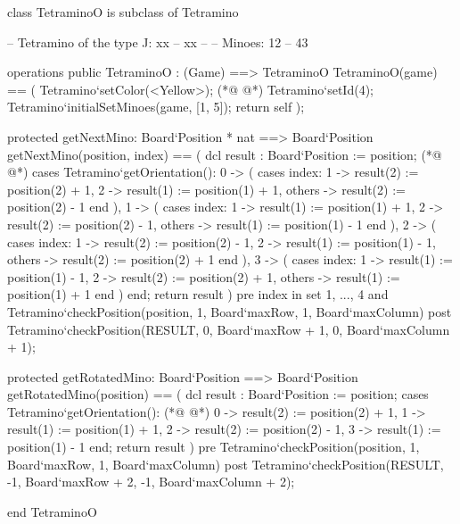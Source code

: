 \begin{vdmpp}[breaklines=true]
class TetraminoO is subclass of Tetramino
  
 -- Tetramino of the type J: xx
 --         xx
 --  
 -- Minoes:       12
 --         43
 

 operations
  public TetraminoO : (Game) ==> TetraminoO
  TetraminoO(game) == (
   Tetramino`setColor(<Yellow>);
(*@
\label{TetraminoO:14}
@*)
   Tetramino`setId(4);
   Tetramino`initialSetMinoes(game, [1, 5]);
   return self
  );

  protected getNextMino: Board`Position * nat ==> Board`Position
  getNextMino(position, index) == (
   dcl result : Board`Position := position;
(*@
\label{getNextMino:22}
@*)
   cases Tetramino`getOrientation():
    0 -> (
     cases index:
      1 -> result(2) := position(2) + 1,
      2 -> result(1) := position(1) + 1,
      others -> result(2) := position(2) - 1
     end
    ),
    1 -> (
     cases index:
      1 -> result(1) := position(1) + 1,
      2 -> result(2) := position(2) - 1,
      others -> result(1) := position(1) - 1
     end
    ),
    2 -> (
     cases index:
      1 -> result(2) := position(2) - 1,
      2 -> result(1) := position(1) - 1,
      others -> result(2) := position(2) + 1
     end
    ),
    3 -> (
     cases index:
      1 -> result(1) := position(1) - 1,
      2 -> result(2) := position(2) + 1,
      others -> result(1) := position(1) + 1
     end
    )
   end;
   return result
  )
  pre index in set {1, ..., 4} 
   and Tetramino`checkPosition(position, 1, Board`maxRow, 1, Board`maxColumn)
  post Tetramino`checkPosition(RESULT, 0, Board`maxRow + 1, 0, Board`maxColumn + 1);
   
  protected getRotatedMino: Board`Position ==> Board`Position
  getRotatedMino(position) == (
   dcl result : Board`Position := position;
   cases Tetramino`getOrientation():
(*@
\label{getRotatedMino:62}
@*)
    0 -> result(2) := position(2) + 1,
    1 -> result(1) := position(1) + 1,
    2 -> result(2) := position(2) - 1,
    3 -> result(1) := position(1) - 1
   end;
   return result
  )
  pre Tetramino`checkPosition(position, 1, Board`maxRow, 1, Board`maxColumn)
  post Tetramino`checkPosition(RESULT, -1, Board`maxRow + 2, -1, Board`maxColumn + 2);

end TetraminoO
\end{vdmpp}
